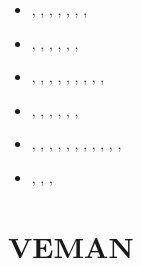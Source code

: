 \begin{small}
\begin{itemize}
                             \textcite{smbc19},  \textcite{canc19b}
\item[\twothousandtwenty]      \textcite{magm20},  \textcite{sams20},  \textcite{capi20}, 
                               \textcite{ghbm20},  \textcite{canc20},  \textcite{cofm20},
                               \textcite{gumc20},  \textcite{sche20}
\item[\twothousandtwentyone]   \textcite{kotr21},  \textcite{qizx21},
                               \textcite{stsc21},  \textcite{zhzl21}, \textcite{scst21},
                               \textcite{xiwk21},  \textcite{kncw21}
\item[\twothousandtwentytwo]   \textcite{wakw22},  \textcite{alrr22b}, \textcite{pefv22},
                               \textcite{olgr22},  \textcite{bahf22},  \textcite{canm22},
                               \textcite{wacw22},  \textcite{baha22},  \textcite{zugc22},
                               \textcite{aryt22}
\item[\twothousandtwentythree] \textcite{lass23}, \textcite{giln23}, \textcite{yaat23},
                               \textcite{scsb23}, \textcite{mord23}, \textcite{ligu23a},
                               \textcite{ligu23b}
\item[\twothousandtwentyfour]  \textcite{deyz24}, \textcite{gucm24}, \textcite{yuga24},
                               \textcite{comi24}, \textcite{waxu24}, \textcite{caks24},
                               \textcite{shmo24}, \textcite{licc24}, \textcite{lihl24},
                               \textcite{chrm24}, \textcite{malb24}, \textcite{fagl24}
\item[\twothousandtwentyfive]  \textcite{walc25}, \textcite{gigl25}, \textcite{gorr25},
                               \textcite{fagm25}
\end{itemize}
\end{small}



\section{VEMAN}

